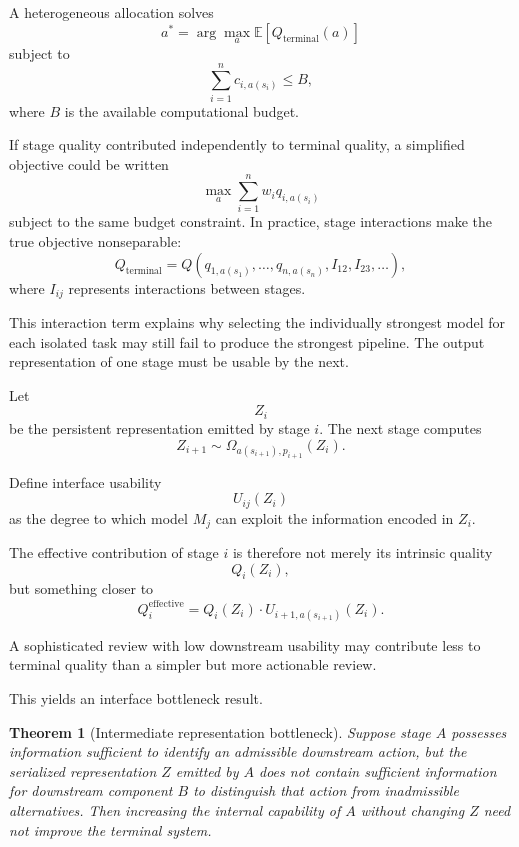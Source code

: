 \documentclass[11pt]{article}
\newtheorem{theorem}[definition]{Theorem}
\begin{document}
A heterogeneous allocation solves
\[
    a^\ast
    =
    \arg\max_a
    \mathbb{E}[Q_{\mathrm{terminal}}(a)]
\]
subject to
\[
    \sum_{i=1}^{n}
    c_{i,a(s_i)}
    \leq B,
\]
where \(B\) is the available computational budget.

If stage quality contributed independently to terminal quality, a simplified objective could be written
\[
    \max_a
    \sum_{i=1}^{n}
    w_iq_{i,a(s_i)}
\]
subject to the same budget constraint. In practice, stage interactions make the true objective nonseparable:
\[
    Q_{\mathrm{terminal}}
    =
    Q(
        q_{1,a(s_1)},
        \ldots,
        q_{n,a(s_n)},
        I_{12},
        I_{23},
        \ldots
    ),
\]
where \(I_{ij}\) represents interactions between stages.

This interaction term explains why selecting the individually strongest model for each isolated task may still fail to produce the strongest pipeline. The output representation of one stage must be usable by the next.

Let
\[
    Z_i
\]
be the persistent representation emitted by stage \(i\). The next stage computes
\[
    Z_{i+1}
    \sim
    \Omega_{a(s_{i+1}),p_{i+1}}(Z_i).
\]

Define interface usability
\[
    U_{ij}(Z_i)
\]
as the degree to which model \(M_j\) can exploit the information encoded in \(Z_i\).

The effective contribution of stage \(i\) is therefore not merely its intrinsic quality
\[
    Q_i(Z_i),
\]
but something closer to
\[
    Q_i^{\mathrm{effective}}
    =
    Q_i(Z_i)
    \cdot
    U_{i+1,a(s_{i+1})}(Z_i).
\]

A sophisticated review with low downstream usability may contribute less to terminal quality than a simpler but more actionable review.

This yields an interface bottleneck result.

\begin{theorem}[Intermediate representation bottleneck]
Suppose stage \(A\) possesses information sufficient to identify an admissible downstream action, but the serialized representation \(Z\) emitted by \(A\) does not contain sufficient information for downstream component \(B\) to distinguish that action from inadmissible alternatives. Then increasing the internal capability of \(A\) without changing \(Z\) need not improve the terminal system.
\end{theorem}
\end{document}
